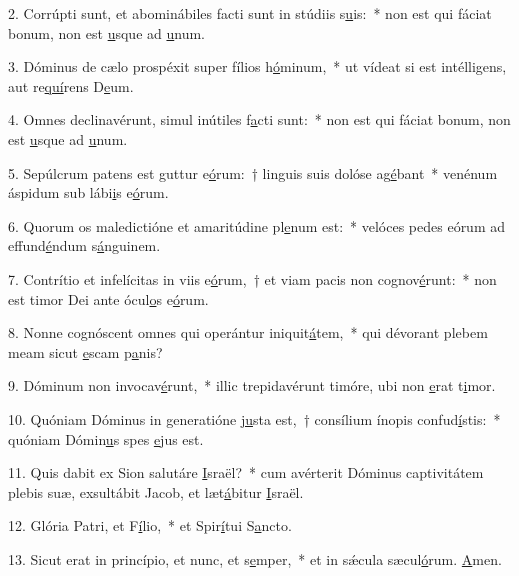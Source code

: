 2. Corrúpti sunt, et abominábiles facti sunt in stúdiis s\uline{u}is:~* non est qui fáciat bonum, non est \uline{u}sque ad \uline{u}num.\par 
3. Dóminus de cælo prospéxit super fílios h\uline{ó}minum,~* ut vídeat si est intélligens, aut re\uline{quí}rens D\uline{e}um.\par 
4. Omnes declinavérunt, simul inútiles f\uline{a}cti sunt:~* non est qui fáciat bonum, non est \uline{u}sque ad \uline{u}num.\par 
5. Sepúlcrum patens est guttur e\uline{ó}rum:~† linguis suis dolóse ag\uline{é}bant~* venénum áspidum sub lábi\uline{i}s e\uline{ó}rum.\par 
6. Quorum os maledictióne et amaritúdine pl\uline{e}num est:~* velóces pedes eórum ad effund\uline{é}ndum s\uline{á}nguinem.\par 
7. Contrítio et infelícitas in viis e\uline{ó}rum,~† et viam pacis non cognov\uline{é}runt:~* non est timor Dei ante ócul\uline{o}s e\uline{ó}rum.\par 
8. Nonne cognóscent omnes qui operántur iniquit\uline{á}tem,~* qui dévorant plebem meam sicut \uline{e}scam p\uline{a}nis?\par 
9. Dóminum non invocav\uline{é}runt,~* illic trepidavérunt timóre, ubi non \uline{e}rat t\uline{i}mor.\par 
10. Quóniam Dóminus in generatióne \uline{ju}sta est,~† consílium ínopis confud\uline{í}stis:~* quóniam Dómin\uline{u}s spes \uline{e}jus est.\par 
11. Quis dabit ex Sion salutáre \uline{I}sraël?~* cum avérterit Dóminus captivitátem plebis suæ, exsultábit Jacob, et læt\uline{á}bitur \uline{I}sraël.\par 
12. Glória Patri, et F\uline{í}lio,~* et Spir\uline{í}tui S\uline{a}ncto.\par 
13. Sicut erat in princípio, et nunc, et s\uline{e}mper,~* et in sǽcula sæcul\uline{ó}rum. \uline{A}men.\par 
